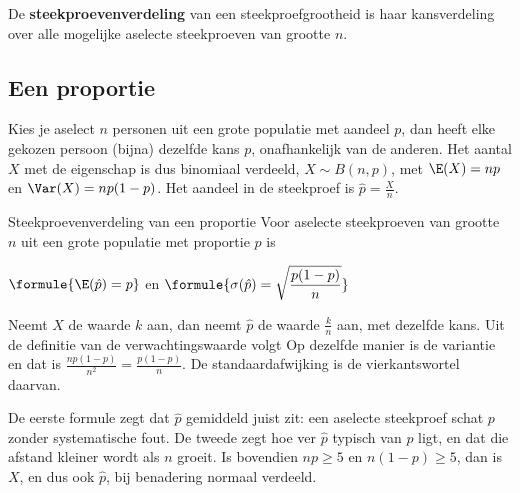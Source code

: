 \begin{theorie}
De \textbf{\textcolor{accent}{steekproevenverdeling}} van een steekproefgrootheid is haar kansverdeling over alle mogelijke aselecte steekproeven van grootte $n$.
\end{theorie}

\subsection{Een proportie}

Kies je aselect $n$ personen uit een grote populatie met aandeel $p$, dan heeft elke gekozen persoon (bijna) dezelfde kans $p$, onafhankelijk van de anderen. Het aantal $X$ met de eigenschap is dus binomiaal verdeeld, $X \sim B(n, p)$, met $\E(X) = np$ en $\Var(X) = np(1 - p)$. Het aandeel in de steekproef is $\hat{p} = \frac{X}{n}$.

\begin{theorie}
\begin{stelling}{Steekproevenverdeling van een proportie}
Voor aselecte steekproeven van grootte $n$ uit een grote populatie met proportie $p$ is

\vspace{1mm}
\qquad $\formule{\E(\hat{p}) = p}$ \qquad en \qquad $\formule{\sigma(\hat{p}) = \sqrt{\dfrac{p(1 - p)}{n}}}$
\end{stelling}

\begin{bewijs}
Neemt $X$ de waarde $k$ aan, dan neemt $\hat{p}$ de waarde $\frac{k}{n}$ aan, met dezelfde kans. Uit de definitie van de verwachtingswaarde volgt
Op dezelfde manier is de variantie
en dat is $\frac{np(1 - p)}{n^2} = \frac{p(1 - p)}{n}$. De standaardafwijking is de vierkantswortel daarvan.
\end{bewijs}
\end{theorie}

De eerste formule zegt dat $\hat{p}$ gemiddeld juist zit: een aselecte steekproef schat $p$ zonder systematische fout. De tweede zegt hoe ver $\hat{p}$ typisch van $p$ ligt, en dat die afstand kleiner wordt als $n$ groeit. Is bovendien $np \geqslant 5$ en $n(1 - p) \geqslant 5$, dan is $X$, en dus ook $\hat{p}$, bij benadering normaal verdeeld.


